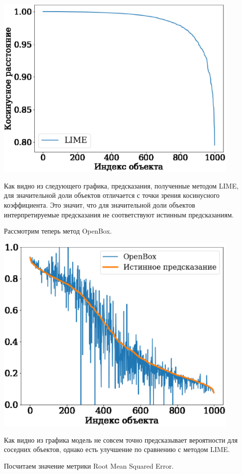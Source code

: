 \documentclass[a4paper, 12pt]{article}
\begin{document}
\includegraphics[width=0.9\textwidth]{../figures/lime_cosine.eps}

Как видно из следующего графика, предсказания, полученные методом LIME, для значительной доли объектов отличается с точки зрения косинусного коэффициента. Это значит, что для значительной доли объектов интерпретируемые предсказания не соответствуют истинным предсказаниям.

Рассмотрим теперь метод OpenBox.

\includegraphics[width=0.9\textwidth]{../figures/openbox_proba_est.eps}

Как видно из графика модель не совсем точно предсказывает вероятности для соседних объектов, однако есть улучшение по сравнению с методом LIME.

Посчитаем значение метрики Root Mean Squared Error.
\end{document}
